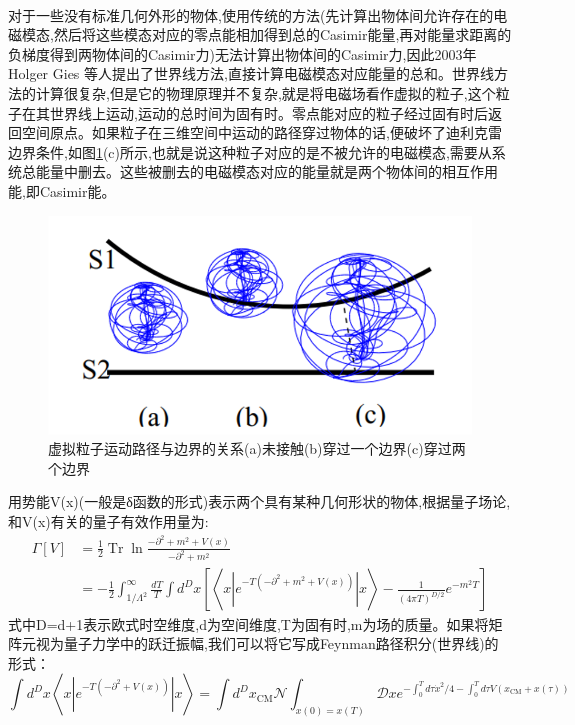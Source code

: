 \paragraph*{}
对于一些没有标准几何外形的物体,使用传统的方法(先计算出物体间允许存在的电磁模态,然后将这些模态对应的零点能相加得到总的Casimir能量,再对能量求距离的负梯度得到两物体间的Casimir力)无法计算出物体间的Casimir力,因此2003年Holger Gies 等人提出了世界线方法\cite{Gies_2003,Gies_2006},直接计算电磁模态对应能量的总和。世界线方法的计算很复杂,但是它的物理原理并不复杂,就是将电磁场看作虚拟的粒子,这个粒子在其世界线上运动,运动的总时间为固有时。零点能对应的粒子经过固有时后返回空间原点。如果粒子在三维空间中运动的路径穿过物体的话,便破坏了迪利克雷边界条件,如图\ref{fig:5}(c)所示,也就是说这种粒子对应的是不被允许的电磁模态,需要从系统总能量中删去。这些被删去的电磁模态对应的能量就是两个物体间的相互作用能,即Casimir能。
\begin{figure}
	\centering
	\includegraphics[scale=1]{figures/世界线2}
	\caption{虚拟粒子运动路径与边界的关系(a)未接触(b)穿过一个边界(c)穿过两个边界}
	\label{fig:5}
\end{figure}
用势能V(x)(一般是δ函数的形式)表示两个具有某种几何形状的物体,根据量子场论,和V(x)有关的量子有效作用量为:
$$
\begin{aligned} \Gamma[V] &=\frac{1}{2} \operatorname{Tr} \ln \frac{-\partial^{2}+m^{2}+V(x)}{-\partial^{2}+m^{2}} \\ &=-\frac{1}{2} \int_{1 / \Lambda^{2}}^{\infty} \frac{d T}{T} \int d^{D} x\left[\left\langle x\left|e^{-T\left(-\partial^{2}+m^{2}+V(x)\right)}\right| x\right\rangle-\frac{1}{(4 \pi T)^{D / 2}} e^{-m^{2} T}\right] \end{aligned}
$$
式中D=d+1表示欧式时空维度,d为空间维度,T为固有时,m为场的质量。如果将矩阵元视为量子力学中的跃迁振幅,我们可以将它写成Feynman路径积分(世界线)的形式：
$$
\int d^{D} x\left\langle x\left|e^{-T\left(-\partial^{2}+V(x)\right)}\right| x\right\rangle=\int d^{D} x_{\mathrm{CM}} \mathcal{N} \int_{x(0)=x(T)} \mathcal{D} x e^{-\int_{0}^{T} d \tau \dot{x}^{2} / 4-\int_{0}^{T} d \tau V\left(x_{\mathrm{CM}}+x(\tau)\right)}
$$
